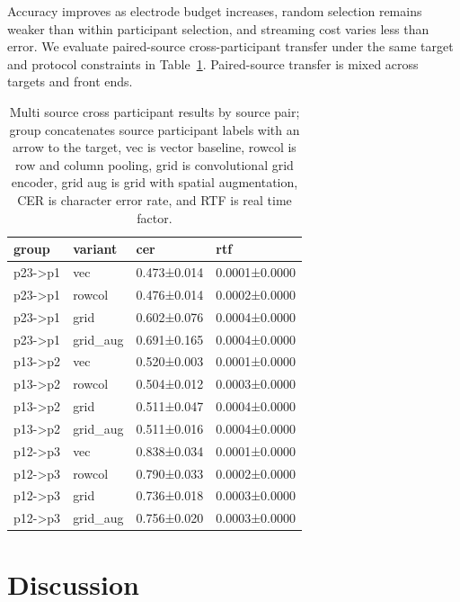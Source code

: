 \documentclass{Interspeech}
\begin{document}
Accuracy improves as electrode budget increases, random selection remains weaker than within participant selection, and streaming cost varies less than error.
We evaluate paired-source cross-participant transfer under the same target and protocol constraints in Table~\ref{tab:p3ms}.
Paired-source transfer is mixed across targets and front ends.
\begin{table}[H]
\centering
\small
\setlength{\tabcolsep}{4pt}
\caption{Multi source cross participant results by source pair; group concatenates source participant labels with an arrow to the target, vec is vector baseline, rowcol is row and column pooling, grid is convolutional grid encoder, grid aug is grid with spatial augmentation, CER is character error rate, and RTF is real time factor.}
\label{tab:p3ms}
\begin{tabular*}{\columnwidth}{@{\extracolsep{\fill}}llll}
\hline
group & variant & cer & rtf \\
\hline
p23->p1 & vec & 0.473±0.014 & 0.0001±0.0000 \\
p23->p1 & rowcol & 0.476±0.014 & 0.0002±0.0000 \\
p23->p1 & grid & 0.602±0.076 & 0.0004±0.0000 \\
p23->p1 & grid\_aug & 0.691±0.165 & 0.0004±0.0000 \\
p13->p2 & vec & 0.520±0.003 & 0.0001±0.0000 \\
p13->p2 & rowcol & 0.504±0.012 & 0.0003±0.0000 \\
p13->p2 & grid & 0.511±0.047 & 0.0004±0.0000 \\
p13->p2 & grid\_aug & 0.511±0.016 & 0.0004±0.0000 \\
p12->p3 & vec & 0.838±0.034 & 0.0001±0.0000 \\
p12->p3 & rowcol & 0.790±0.033 & 0.0002±0.0000 \\
p12->p3 & grid & 0.736±0.018 & 0.0003±0.0000 \\
p12->p3 & grid\_aug & 0.756±0.020 & 0.0003±0.0000 \\
\hline
\end{tabular*}
\end{table}


\FloatBarrier
\section{Discussion}
\end{document}

